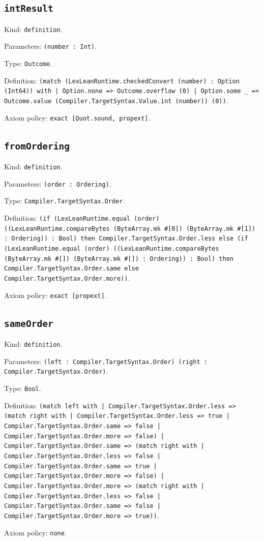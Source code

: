 \documentclass[11pt]{article}
\begin{document}
\subsection*{\texttt{intResult}}
\noindent Kind: \texttt{definition}.\par
\noindent Parameters: \texttt{(number : Int)}.\par
\noindent Type: \texttt{Outcome}.\par
\noindent Definition: \texttt{(match (LexLeanRuntime.checkedConvert (number) : Option (Int64)) with | Option.none => Outcome.overflow (0) | Option.some \_ => Outcome.value (Compiler.TargetSyntax.Value.int (number)) (0))}.\par
\noindent Axiom policy: \texttt{exact [Quot.sound, propext]}.\par
\subsection*{\texttt{fromOrdering}}
\noindent Kind: \texttt{definition}.\par
\noindent Parameters: \texttt{(order : Ordering)}.\par
\noindent Type: \texttt{Compiler.TargetSyntax.Order}.\par
\noindent Definition: \texttt{(if (LexLeanRuntime.equal (order) ((LexLeanRuntime.compareBytes (ByteArray.mk \#[0]) (ByteArray.mk \#[1]) : Ordering)) : Bool) then Compiler.TargetSyntax.Order.less else (if (LexLeanRuntime.equal (order) ((LexLeanRuntime.compareBytes (ByteArray.mk \#[]) (ByteArray.mk \#[]) : Ordering)) : Bool) then Compiler.TargetSyntax.Order.same else Compiler.TargetSyntax.Order.more))}.\par
\noindent Axiom policy: \texttt{exact [propext]}.\par
\subsection*{\texttt{sameOrder}}
\noindent Kind: \texttt{definition}.\par
\noindent Parameters: \texttt{(left : Compiler.TargetSyntax.Order) (right : Compiler.TargetSyntax.Order)}.\par
\noindent Type: \texttt{Bool}.\par
\noindent Definition: \texttt{(match left with | Compiler.TargetSyntax.Order.less => (match right with | Compiler.TargetSyntax.Order.less => true | Compiler.TargetSyntax.Order.same => false | Compiler.TargetSyntax.Order.more => false) | Compiler.TargetSyntax.Order.same => (match right with | Compiler.TargetSyntax.Order.less => false | Compiler.TargetSyntax.Order.same => true | Compiler.TargetSyntax.Order.more => false) | Compiler.TargetSyntax.Order.more => (match right with | Compiler.TargetSyntax.Order.less => false | Compiler.TargetSyntax.Order.same => false | Compiler.TargetSyntax.Order.more => true))}.\par
\noindent Axiom policy: \texttt{none}.\par
\end{document}

